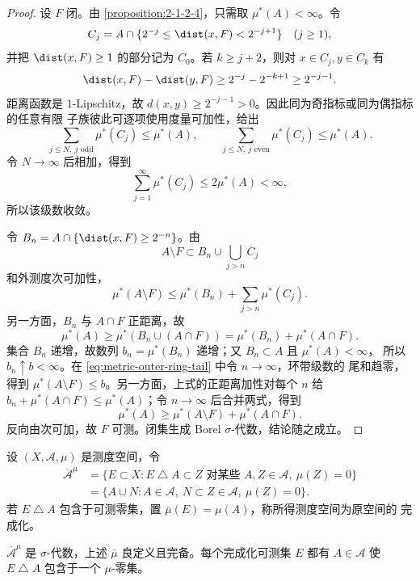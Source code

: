 \begin{proof}
设 $F$ 闭。由 \cref{proposition:2-1-2-4}，只需取 $\mu^*(A)<\infty$。令
\[
 C_j=A\cap\{2^{-j}\le\dist(x,F)<2^{-j+1}\}\quad(j\ge1),
\]
并把 $\dist(x,F)\ge1$ 的部分记为 $C_0$。若 $k\ge j+2$，则对
$x\in C_j,y\in C_k$ 有
\[
 \dist(x,F)-\dist(y,F)
 \ge2^{-j}-2^{-k+1}\ge2^{-j-1}.
\]
距离函数是 $1$-Lipschitz，故 $d(x,y)\ge2^{-j-1}>0$。因此同为奇指标或同为偶指标的任意有限
子族彼此可逐项使用度量可加性，给出
\[
 \sum_{j\le N,\ j\text{ odd}}\mu^*(C_j)\le\mu^*(A),\qquad
 \sum_{j\le N,\ j\text{ even}}\mu^*(C_j)\le\mu^*(A).
\]
令 $N\to\infty$ 后相加，得到
\[
 \sum_{j=1}^{\infty}\mu^*(C_j)\le2\mu^*(A)<\infty,
\]
所以该级数收敛。

令 $B_n=A\cap\{\dist(x,F)\ge2^{-n}\}$。由
\[
 A\setminus F\subset B_n\cup\bigcup_{j>n}C_j
\]
和外测度次可加性，
\[
 \mu^*(A\setminus F)
 \le \mu^*(B_n)+\sum_{j>n}\mu^*(C_j).
 \label{eq:metric-outer-ring-tail}
\]
另一方面，$B_n$ 与 $A\cap F$ 正距离，故
\[
 \mu^*(A)\ge\mu^*(B_n\cup(A\cap F))
 =\mu^*(B_n)+\mu^*(A\cap F).
\]
集合 $B_n$ 递增，故数列 $b_n=\mu^*(B_n)$ 递增；又 $B_n\subset A$ 且 $\mu^*(A)<\infty$，
所以 $b_n\uparrow b<\infty$。在 \eqref{eq:metric-outer-ring-tail} 中令 $n\to\infty$，环带级数的
尾和趋零，得到 $\mu^*(A\setminus F)\le b$。另一方面，上式的正距离加性对每个 $n$ 给
$b_n+\mu^*(A\cap F)\le\mu^*(A)$；令 $n\to\infty$ 后合并两式，得到
\[
 \mu^*(A)\ge\mu^*(A\setminus F)+\mu^*(A\cap F).
\]
反向由次可加，故 $F$ 可测。闭集生成 Borel $\sigma$-代数，结论随之成立。
\end{proof}

\begin{definition}[测度空间的完成化]\label{def:measure-completion}
设 $(X,\mathcal A,\mu)$ 是测度空间，令
\[
 \begin{aligned}
 \overline{\mathcal A}^{\mu}
 &=\{E\subset X:E\mathbin\triangle A\subset Z
       \text{ 对某些 }A,Z\in\mathcal A,\ \mu(Z)=0\}\\
 &=\{A\cup N:A\in\mathcal A,\ N\subset Z\in\mathcal A,\ \mu(Z)=0\}.
 \end{aligned}
\]
若 $E\mathbin\triangle A$ 包含于可测零集，置 $\bar\mu(E)=\mu(A)$，称所得测度空间为原空间的
完成化。
\end{definition}

\begin{proposition}[完成化的代表]\label{prop:measure-completion-representative}
$\overline{\mathcal A}^{\mu}$ 是 $\sigma$-代数，上述 $\bar\mu$ 良定义且完备。每个完成化可测集
$E$ 都有 $A\in\mathcal A$ 使 $E\mathbin\triangle A$ 包含于一个 $\mu$-零集。
\end{proposition}

